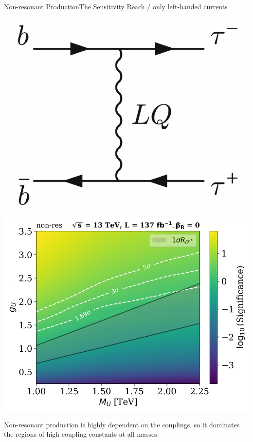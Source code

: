 \documentclass{../bredelebeamer}
\begin{document}
\begin{frame}{Non-resonant Production}{The Sensitivity Reach / only left-handed currents}
	\begin{minipage}{.30\linewidth}
		\includegraphics[width=\linewidth]{non_resonant.png}
	\end{minipage}
	\begin{minipage}{.68\linewidth}
		\includegraphics[width=\linewidth]{Significance_Heatmap_13TeV_L137_non-res_combined_woRHC.pdf}
	\end{minipage}

	{\large
		  Non-resonant production is highly dependent on the couplings, so it dominates the regions of high coupling constants at all masses.
	}
\end{frame}
\end{document}
